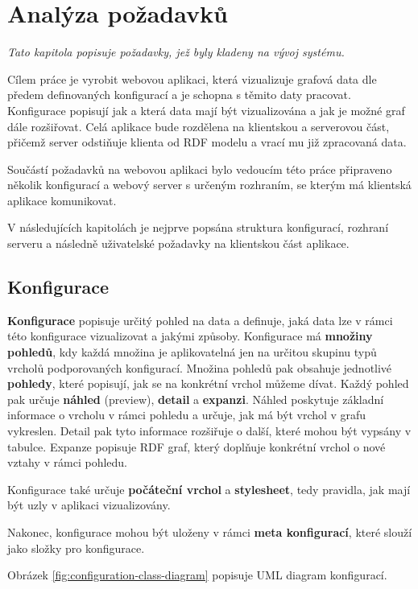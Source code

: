 \chapter{Analýza požadavků}

\textit{Tato kapitola popisuje požadavky, jež byly kladeny na vývoj systému.}

Cílem práce je vyrobit webovou aplikaci, která vizualizuje grafová data dle předem definovaných konfigurací a je schopna s těmito daty pracovat. Konfigurace popisují jak a která data mají být vizualizována a jak je možné graf dále rozšiřovat. Celá aplikace bude rozdělena na klientskou a serverovou část, přičemž server odstiňuje klienta od RDF modelu a vrací mu již zpracovaná data.

Součástí požadavků na webovou aplikaci bylo vedoucím této práce připraveno několik konfigurací a webový server s určeným rozhraním, se kterým má klientská aplikace komunikovat.

V následujících kapitolách je nejprve popsána struktura konfigurací, rozhraní serveru a následně uživatelské požadavky na klientskou část aplikace.

\section{Konfigurace}

\textbf{Konfigurace} popisuje určitý pohled na data a definuje, jaká data lze v rámci této konfigurace vizualizovat a jakými způsoby. Konfigurace má \textbf{množiny pohledů}, kdy každá množina je aplikovatelná jen na určitou skupinu typů vrcholů podporovaných konfigurací. Množina pohledů pak obsahuje jednotlivé \textbf{pohledy}, které popisují, jak se na konkrétní vrchol můžeme dívat. Každý pohled pak určuje \textbf{náhled} (preview), \textbf{detail} a \textbf{expanzi}. Náhled poskytuje základní informace o vrcholu v rámci pohledu a určuje, jak má být vrchol v grafu vykreslen. Detail pak tyto informace rozšiřuje o další, které mohou být vypsány v tabulce. Expanze popisuje RDF graf, který doplňuje konkrétní vrchol o nové vztahy v rámci pohledu.

Konfigurace také určuje \textbf{počáteční vrchol} a \textbf{stylesheet}, tedy pravidla, jak mají být uzly v aplikaci vizualizovány.

Nakonec, konfigurace mohou být uloženy v rámci \textbf{meta konfigurací}, které slouží jako složky pro konfigurace.

Obrázek \ref{fig:configuration-class-diagram} popisuje UML diagram konfigurací.

